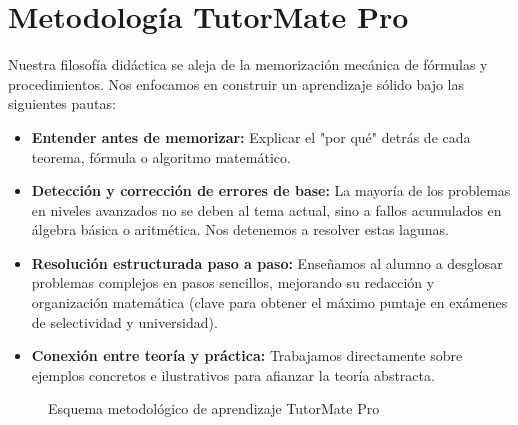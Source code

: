 \documentclass[11pt,a4paper]{article}
\begin{document}
\section{Metodología TutorMate Pro}
Nuestra filosofía didáctica se aleja de la memorización mecánica de fórmulas y procedimientos. Nos enfocamos en construir un aprendizaje sólido bajo las siguientes pautas:
\begin{itemize}
    \item \textbf{Entender antes de memorizar:} Explicar el "por qué" detrás de cada teorema, fórmula o algoritmo matemático.
    \item \textbf{Detección y corrección de errores de base:} La mayoría de los problemas en niveles avanzados no se deben al tema actual, sino a fallos acumulados en álgebra básica o aritmética. Nos detenemos a resolver estas lagunas.
    \item \textbf{Resolución estructurada paso a paso:} Enseñamos al alumno a desglosar problemas complejos en pasos sencillos, mejorando su redacción y organización matemática (clave para obtener el máximo puntaje en exámenes de selectividad y universidad).
    \item \textbf{Conexión entre teoría y práctica:} Trabajamos directamente sobre ejemplos concretos e ilustrativos para afianzar la teoría abstracta.
\end{itemize}

\begin{figure}[h]
\centering
{}
\caption{Esquema metodológico de aprendizaje TutorMate Pro}
\label{fig:flujo}
\end{figure}
\end{document}
